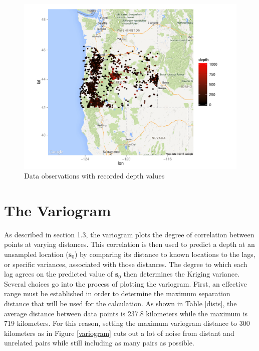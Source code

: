 \documentclass[12pt,twoside]{reedthesis}
\begin{document}
\begin{figure}[h]
	   
	       \centering
	  
	    \includegraphics[scale=0.8]{points_plot}
	
	     \caption{Data observations with recorded depth values}
	 \label{points}
	\end{figure}


\section{The Variogram}


As described in section 1.3, the variogram plots the degree of correlation between points at varying distances. This correlation is then used to predict a depth at an unsampled location ($\mathbf{s}_0$) by comparing its distance to known locations to the lags, or specific variances, associated with those distances. The degree to which each lag agrees on the predicted value of $\mathbf{s}_0$ then determines the Kriging variance. \\

Several choices go into the process of plotting the variogram. First, an effective range must be established in order to determine the maximum separation distance that will be used for the calculation. As shown in Table \ref{dists}, the average distance between data points is 237.8 kilometers while the maximum is 719 kilometers. For this reason, setting the maximum variogram distance to 300 kilometers as in Figure \ref{variogram} cuts out a lot of noise from distant and unrelated pairs while still including as many pairs as possible. 
\end{document}
